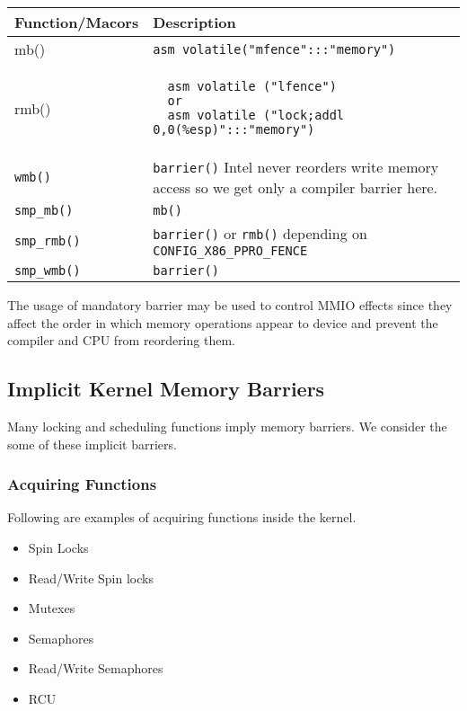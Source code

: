 \documentclass{article}
\begin{document}
  \begin{tabular}{ l | p{9 cm} }    
    \hline
    Function/Macors & Description \\ \hline
    mb() & \lstinline{asm volatile("mfence":::"memory")}  \\  \hline
    rmb() &
\begin{lstlisting}
  asm volatile ("lfence")
  or
  asm volatile ("lock;addl 0,0(%esp)":::"memory")
\end{lstlisting}
      \\ \hline
      \lstinline{wmb()} & \lstinline{barrier()}
      Intel never reorders write memory access so we get only a compiler barrier here.  \\ \hline
    \lstinline{smp_mb()}  & \lstinline{mb()}   \\ \hline
    \lstinline{smp_rmb()} &  \lstinline{barrier()} or \lstinline{rmb()} depending on \lstinline{CONFIG_X86_PPRO_FENCE}\\ \hline
    \lstinline{smp_wmb()} & \lstinline{barrier()} \\     \hline
  \end{tabular}

The usage of mandatory barrier may be used to control MMIO effects
since they affect the order in which memory operations appear to
device and prevent the compiler and CPU from reordering them.


\subsection{Implicit Kernel Memory Barriers}

Many locking and scheduling functions imply memory barriers. We
consider the some of these implicit barriers.

\subsubsection{Acquiring Functions}

Following are examples of acquiring functions inside the kernel.

\begin{itemize}
  \item Spin Locks
  \item Read/Write Spin locks
  \item Mutexes
  \item Semaphores
  \item Read/Write Semaphores
  \item RCU
\end{itemize}
\end{document}
